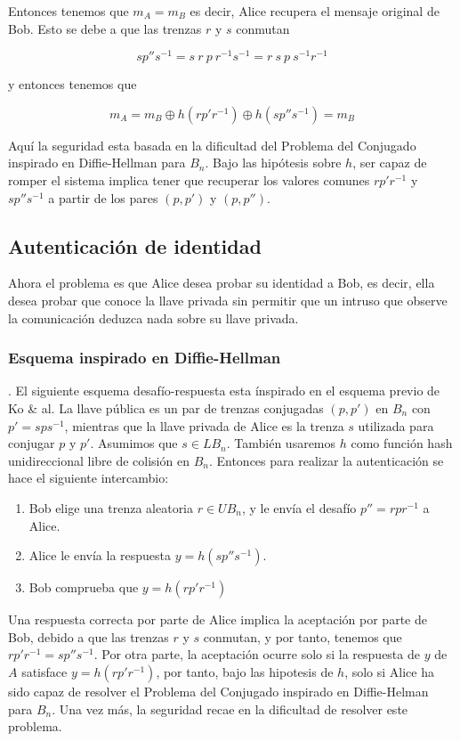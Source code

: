 \documentclass[12pt]{article}
\theoremstyle{definition}
\begin{document}
Entonces tenemos que $m_A = m_B$ es decir, Alice recupera el mensaje original de Bob. Esto se debe a que las trenzas $r$ y $s$ conmutan

$$sp''s^{-1}=s\ r\ p\ r^{-1}s^{-1}=r\ s\ p\ s^{-1}r^{-1}$$

y entonces tenemos que 

$$m_A = m_B\oplus h(rp'r^{-1})\oplus h(sp''s^{-1})=m_B$$

Aquí la seguridad esta basada en la dificultad del Problema del Conjugado inspirado en Diffie-Hellman para $B_n$. Bajo las hipótesis sobre $h$, ser capaz de romper el sistema implica tener que recuperar los valores comunes $rp'r^{-1}$ y $sp''s^{-1}$ a partir de los pares $(p,p')$ y $(p,p'')$.

\subsection{Autenticación de identidad}
Ahora el problema es que Alice desea probar su identidad a Bob, es decir, ella desea probar que conoce la llave privada sin permitir que un intruso que observe la comunicación deduzca nada sobre su llave privada.

\subsubsection{Esquema inspirado en Diffie-Hellman}. El siguiente esquema desafío-respuesta esta ínspirado en el esquema previo de Ko \& al. La llave pública es un par de trenzas conjugadas $(p,p')$ en $B_n$ con $p'=sps^{-1}$, mientras que la llave privada de Alice es la trenza $s$ utilizada para conjugar $p$ y $p'$. Asumimos que $s\in LB_n$. También usaremos $h$ como función hash unidireccional libre de colisión en $B_n$. Entonces para realizar la autenticación se hace el siguiente intercambio:

\begin{enumerate}
\item Bob elige una trenza aleatoria $r\in UB_n$, y le envía el desafío $p''=rpr^{-1}$ a Alice.
\item Alice le envía la respuesta $y = h(sp''s^{-1})$.
\item Bob comprueba que $y=h(rp'r^{-1})$
\end{enumerate}

Una respuesta correcta por parte de Alice implica la aceptación por parte de Bob, debido a que las trenzas $r$ y $s$ conmutan, y por tanto, tenemos que $rp'r^{-1}=sp''s^{-1}$. Por otra parte, la aceptación ocurre solo si la respuesta de $y$ de $A$ satisface $y=h(rp'r^{-1})$, por tanto, bajo las hipotesis de $h$, solo si Alice ha sido capaz de resolver el Problema del Conjugado inspirado en Diffie-Helman para $B_n$. Una vez más, la seguridad recae en la dificultad de resolver este problema.
\end{document}
